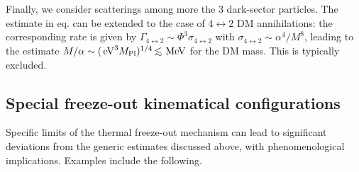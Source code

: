 \medskip

Finally, we consider scatterings among more the 3 dark-sector particles.
The estimate in eq. can be extended to the case of $4\leftrightarrow2$ DM annihilations:
the corresponding rate is given by
$\Gamma_{4\leftrightarrow2} \sim \Phi^3 \sigma_{4\leftrightarrow2} $ with
$\sigma_{4\leftrightarrow2} \sim \alpha^4/M^8$, leading
 to the estimate $M/\alpha \sim (\eV^3 M_{\rm Pl})^{1/4}\circa{<}\MeV$ for the DM mass. 
 This is typically excluded.

\subsection{Special freeze-out kinematical configurations}
Specific limits of the thermal freeze-out mechanism can lead to significant deviations from the generic estimates discussed above, with phenomenological implications. 
Examples include the following.

